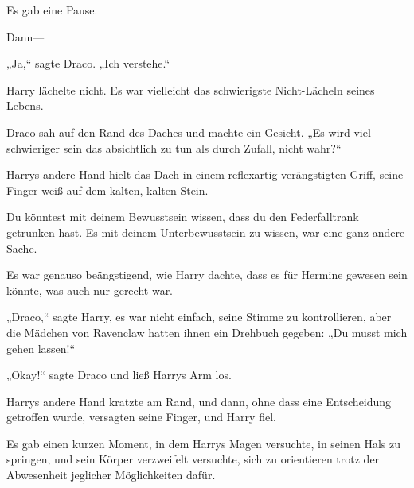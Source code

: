 Es gab eine Pause.

Dann—

„Ja,“ sagte Draco. „Ich verstehe.“

Harry lächelte nicht. Es war vielleicht das schwierigste Nicht-Lächeln seines Lebens.

Draco sah auf den Rand des Daches und machte ein Gesicht. „Es wird viel schwieriger sein das absichtlich zu tun als durch Zufall, nicht wahr?“

\later

Harrys andere Hand hielt das Dach in einem reflexartig verängstigten Griff, seine Finger weiß auf dem kalten, kalten Stein.

Du könntest mit deinem Bewusstsein wissen, dass du den Federfalltrank getrunken hast. Es mit deinem Unterbewusstsein zu wissen, war eine ganz andere Sache.

Es war genauso beängstigend, wie Harry dachte, dass es für Hermine gewesen sein könnte, was auch nur gerecht war.

„Draco,“ sagte Harry, es war nicht einfach, seine Stimme zu kontrollieren, aber die Mädchen von Ravenclaw hatten ihnen ein Drehbuch gegeben: „Du musst mich gehen lassen!“

„Okay!“ sagte Draco und ließ Harrys Arm los.

Harrys andere Hand kratzte am Rand, und dann, ohne dass eine Entscheidung getroffen wurde, versagten seine Finger, und Harry fiel.

Es gab einen kurzen Moment, in dem Harrys Magen versuchte, in seinen Hals zu springen, und sein Körper verzweifelt versuchte, sich zu orientieren trotz der Abwesenheit jeglicher Möglichkeiten dafür.

